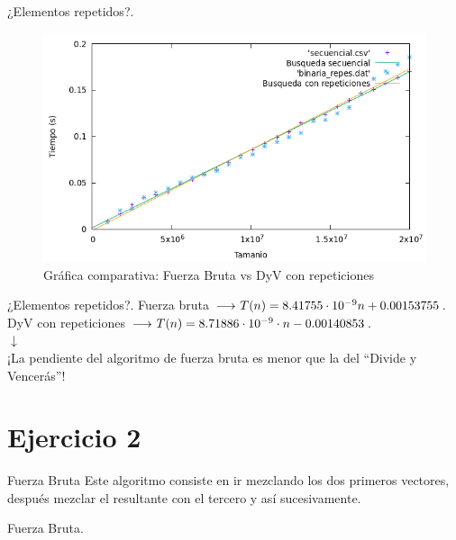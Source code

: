 \documentclass[10pt, xcolor=table]{beamer}
\begin{document}
\begin{frame}[fragile]{¿Elementos repetidos?. }
	\begin{figure}[h!]
		\centering
		\includegraphics[scale=0.45]{./Images/Grafica_secvsrep.png}
		\caption{Gráfica comparativa: Fuerza Bruta vs DyV con repeticiones}
	\end{figure}
\end{frame}

\begin{frame}[fragile]{¿Elementos repetidos?. }
	\centering Fuerza bruta \(\longrightarrow$ \( T(n) = 8.41755 \cdot 10^{-9} n + 0.00153755\).\\
	
	\centering DyV con repeticiones \(\longrightarrow$ \( T(n) = 8.71886 \cdot 10^{-9} \cdot n -0.00140853 \).\\
	
	\centering $\downarrow$ \\
	
	\centering ¡La pendiente del algoritmo de fuerza bruta es menor que la del ``Divide y Vencerás''!
\end{frame}

\section{Ejercicio 2}

\begin{frame}[fragile]{Fuerza Bruta}
Este algoritmo consiste en ir mezclando los dos primeros vectores, después mezclar el resultante con el tercero y así sucesivamente.
\end{frame}

\begin{frame}[fragile]{Fuerza Bruta. }
\centering
\scalebox{0.4}{
\centering

}
\end{frame}
\end{document}
